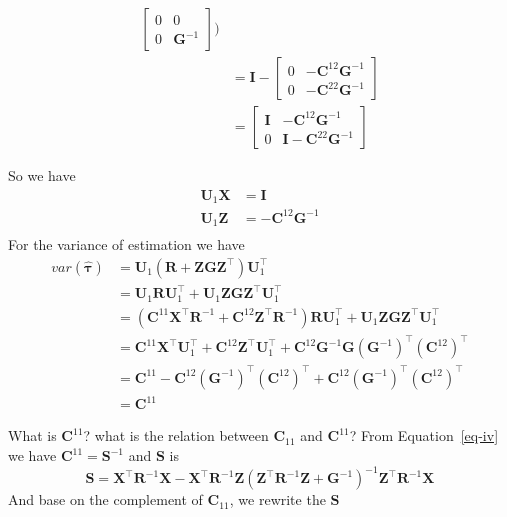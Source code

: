 \documentclass[
  a4paper,
  oneside,
  openany,
  12pt,
  onecolumn]{book}
\theoremstyle{definition}
\theoremstyle{plain}
\theoremstyle{remark}
\begin{document}
\[\begin{aligned}
\begin{bmatrix}
0 & 0 \\
0 & \boldsymbol{G}^{-1}
\end{bmatrix})\\
&=
\boldsymbol{I}-
\begin{bmatrix}
0 & -\boldsymbol{C}^{12}\boldsymbol{G}^{-1} \\
0 & -\boldsymbol{C}^{22}\boldsymbol{G}^{-1}
\end{bmatrix}\\
&=
\begin{bmatrix}
\boldsymbol{I} & -\boldsymbol{C}^{12}\boldsymbol{G}^{-1} \\
0 & \boldsymbol{I}-\boldsymbol{C}^{22}\boldsymbol{G}^{-1}
\end{bmatrix}
\end{aligned}\]

So we have \[\begin{aligned}
\boldsymbol{U}_1\boldsymbol{X}&=\boldsymbol{I}\\
\boldsymbol{U}_1\boldsymbol{Z}&=-\boldsymbol{C}^{12}\boldsymbol{G}^{-1}\\
\end{aligned}\] For the variance of estimation we have \[\begin{aligned}
var(\hat{\boldsymbol{\tau}})
&=
\boldsymbol{U}_1(\boldsymbol{R}+\boldsymbol{ZGZ}^\top)\boldsymbol{U}_1^\top\\
&= \boldsymbol{U}_1\boldsymbol{R}\boldsymbol{U}_1^\top+\boldsymbol{U}_1\boldsymbol{ZGZ}^\top\boldsymbol{U}_1^\top\\
&= (\boldsymbol{C}^{11}\boldsymbol{X}^\top\boldsymbol{R}^{-1}+\boldsymbol{C}^{12}\boldsymbol{Z}^\top\boldsymbol{R}^{-1})\boldsymbol{R}\boldsymbol{U}_1^\top+\boldsymbol{U}_1\boldsymbol{ZGZ}^\top\boldsymbol{U}_1^\top\\
&=\boldsymbol{C}^{11}\boldsymbol{X}^\top\boldsymbol{U}_1^\top+\boldsymbol{C}^{12}\boldsymbol{Z}^\top\boldsymbol{U}_1^\top+\boldsymbol{C}^{12}\boldsymbol{G}^{-1}\boldsymbol{G}(\boldsymbol{G}^{-1})^\top(\boldsymbol{C}^{12})^\top\\
&=\boldsymbol{C}^{11}-\boldsymbol{C}^{12}(\boldsymbol{G}^{-1})^\top(\boldsymbol{C}^{12})^\top+\boldsymbol{C}^{12}(\boldsymbol{G}^{-1})^\top(\boldsymbol{C}^{12})^\top\\
&=\boldsymbol{C}^{11}
\end{aligned}\]

What is \(\boldsymbol{C}^{11}\)? what is the relation between
\(\boldsymbol{C}_{11}\) and \(\boldsymbol{C}^{11}\)? From
Equation~\ref{eq-iv} we have \(\boldsymbol{C}^{11}=\boldsymbol{S}^{-1}\)
and \(\boldsymbol{S}\) is \[
\boldsymbol{S} = \boldsymbol{X}^\top \boldsymbol{R}^{-1} \boldsymbol{X} - \boldsymbol{X}^\top \boldsymbol{R}^{-1} \boldsymbol{Z} (\boldsymbol{Z}^\top \boldsymbol{R}^{-1} \boldsymbol{Z} + \boldsymbol{G}^{-1})^{-1} \boldsymbol{Z}^\top \boldsymbol{R}^{-1} \boldsymbol{X}
\] And base on the complement of \(\boldsymbol{C}_{11}\), we rewrite the
\(\boldsymbol{S}\)
\end{document}
